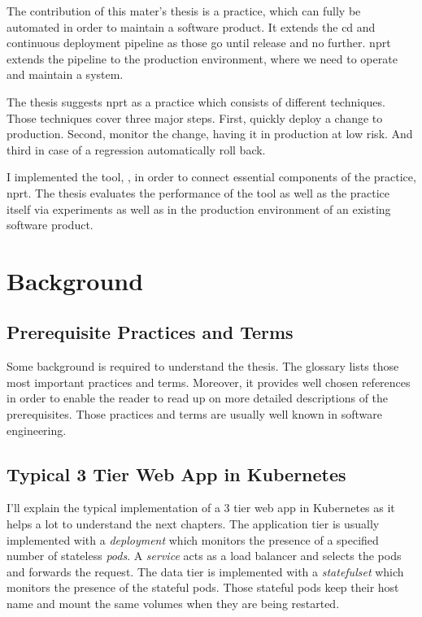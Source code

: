 The contribution of this mater's thesis is a practice, which can fully be automated in order
to maintain a software product. It extends the \gls{cd} and continuous deployment pipeline
as those go until release and no further. \gls{nprt} extends the pipeline to the
production environment, where we need to operate and maintain a system.

The thesis suggests \gls{nprt} as a practice which consists of different techniques. Those
techniques cover three major steps. First, quickly deploy a change to production. Second,
monitor the change, having it in production at low risk. And third in case of a regression
automatically roll back.

I implemented the tool, \deployer, in order to connect essential components of the
practice, \gls{nprt}. The thesis evaluates the performance of the tool as well as the
practice itself via experiments as well as in the production environment of an existing
software product.

\chapter{Background}
\label{chap:background}

\section{Prerequisite Practices and Terms}

Some background is required to understand the thesis. The glossary lists those most
important practices and terms. Moreover, it provides well chosen references in order to
enable the reader to read up on more detailed descriptions of the prerequisites. Those
practices and terms are usually well known in software engineering.

\section{Typical 3 Tier Web App in Kubernetes}

I'll explain the typical implementation of a 3 tier web app in Kubernetes as it helps a
lot to understand the next chapters. The application tier is usually implemented with a
\emph{deployment} which monitors the presence of a specified number of stateless
\emph{pods}. A \emph{service} acts as a load balancer and selects the pods and forwards
the request. The data tier is implemented with a \emph{statefulset} which monitors the
presence of the stateful pods. Those stateful pods keep their host name and mount the same
volumes when they are being restarted.

